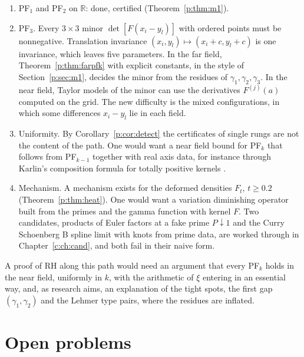 \begin{enumerate}
\item PF$_1$ and PF$_2$ on $\mathbb R$: done, certified (Theorem~\ref{p:thm:m1}).
\item PF$_3$. Every $3\times3$ minor $\det[F(x_i-y_l)]$ with ordered points must be nonnegative. Translation invariance $(x_i,y_l)\mapsto(x_i+c,y_l+c)$ is one invariance, which leaves five parameters. In the far field, Theorem~\ref{p:thm:farpfk} with explicit constants, in the style of Section~\ref{p:sec:m1}, decides the minor from the residues of $\gamma_1,\gamma_2,\gamma_3$. In the near field, Taylor models of the minor can use the derivatives $F^{(j)}(a)$ computed on the grid. The new difficulty is the mixed configurations, in which some differences $x_i-y_l$ lie in each field.
\item Uniformity. By Corollary~\ref{p:cor:detect} the certificates of single rungs are not the content of the path. One would want a near field bound for PF$_k$ that follows from PF$_{k-1}$ together with real axis data, for instance through Karlin's composition formula for totally positive kernels \cite{Karlin68}.
\item Mechanism. A mechanism exists for the deformed densities $F_t$, $t\ge0.2$ (Theorem~\ref{p:thm:heat}). One would want a variation diminishing operator built from the primes and the gamma function with kernel $F$. Two candidates, products of Euler factors at a fake prime $P\downarrow1$ and the Curry Schoenberg B spline limit with knots from prime data, are worked through in Chapter~\ref{c:ch:cand}, and both fail in their naive form.
\end{enumerate}

A proof of RH along this path would need an argument that every PF$_k$ holds in the near field, uniformly in $k$, with the arithmetic of $\xi$ entering in an essential way, and, as research aims, an explanation of the tight spots, the first gap $(\gamma_1,\gamma_2)$ and the Lehmer type pairs, where the residues are inflated.

\section{Open problems}\label{p:sec:open}

